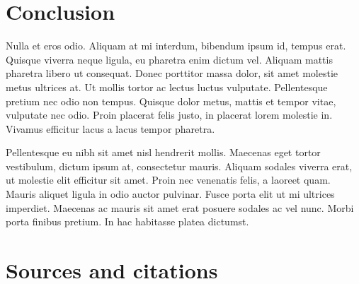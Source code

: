 \documentclass[a4paper, 11pt] {article}
\begin{document}
\section{Conclusion}

 Nulla et eros odio. Aliquam at mi interdum, bibendum ipsum id, tempus erat. Quisque viverra neque ligula, eu pharetra enim dictum vel. Aliquam mattis pharetra libero ut consequat. Donec porttitor massa dolor, sit amet molestie metus ultrices at. Ut mollis tortor ac lectus luctus vulputate. Pellentesque pretium nec odio non tempus. Quisque dolor metus, mattis et tempor vitae, vulputate nec odio. Proin placerat felis justo, in placerat lorem molestie in. Vivamus efficitur lacus a lacus tempor pharetra.

Pellentesque eu nibh sit amet nisl hendrerit mollis. Maecenas eget tortor vestibulum, dictum ipsum at, consectetur mauris. Aliquam sodales viverra erat, ut molestie elit efficitur sit amet. Proin nec venenatis felis, a laoreet quam. Mauris aliquet ligula in odio auctor pulvinar. Fusce porta elit ut mi ultrices imperdiet. Maecenas ac mauris sit amet erat posuere sodales ac vel nunc. Morbi porta finibus pretium. In hac habitasse platea dictumst. 

\section*{Sources and citations}
\end{document}
